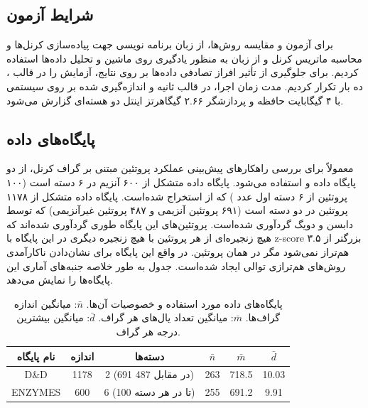 \subsection{شرایط آزمون}
برای آزمون و مقایسه روش‌ها، از زبان برنامه نویسی  جهت پیاده‌سازی کرنل‌ها و محاسبه ماتریس کرنل و از زبان  به منظور یادگیری روی ماشین  و تحلیل داده‌ها استفاده کردیم. برای جلوگیری از تأثیر افراز تصادفی داده‌ها بر روی نتایج، آزمایش را در قالب ، ده بار تکرار کردیم. مدت زمان اجرا، در قالب ثانیه و اندازه‌گیری شده بر روی سیستمی با ۴ گیگابایت حافظه و پردازشگر ۲.۶۶ گیگاهرتز اینتل دو هسته‌ای گزارش می‌شود.

\subsection{پایگاه‌های داده}
معمولاً برای بررسی راهکارهای پیش‌بینی عملکرد پروتئین مبتنی بر گراف کرنل، از دو پایگاه داده  و  استفاده می‌شود.  پایگاه داده متشکل از ۶۰۰ آنزیم در ۶ دسته است (۱۰۰ پروتئین از ۶ دسته اول عدد ) که از  استخراج شده‌است.  پایگاه داده متشکل از ۱۱۷۸ پروتئین در دو دسته است (۶۹۱ پروتئین آنزیمی و ۴۸۷ پروتئین غیرآنزیمی) که توسط دابسن و دویگ گردآوری شده‌است. پروتئین‌های این پایگاه طوری گردآوری شده‌اند که هیچ زنجیره‌ای از هر پروتئین با هیچ زنجیره دیگری در این پایگاه با z-score بزرگتر از ۳.۵ هم‌تراز نمی‌شود مگر در همان پروتئین. در واقع این پایگاه برای نشان‌دادن ناکارآمدی روش‌های هم‌ترازی توالی ایجاد شده‌است. جدول  به طور خلاصه جنبه‌های آماری این پایگاه‌ها را نمایش می‌دهد.

\begin{table}[ht]
\centering
\begin{tabular}{| c | c | c | c | c | c |}
    \hline
    نام پایگاه & اندازه & دسته‌ها & $\bar{n}$ & $\bar{m}$ & $\bar{d}$\\[5pt] \hline
    D\&D & 1178 & 2 (691 در مقابل 487) & 263 & 718.5 & 10.03 \\ \hline
    ENZYMES & 600 & 6 (100 تا در هر دسته) & 255 & 691.2 & 9.91 \\ \hline
\end{tabular}
\caption[پایگاه‌های داده مورد استفاده و خصوصیات آن‌ها]{
    پایگاه‌های داده مورد استفاده و خصوصیات آن‌ها.
 $\bar{n}$: میانگین اندازه گراف‌ها. $\bar{m}$: میانگین تعداد یال‌های هر گراف.  $\bar{d}$: میانگین بیشترین درجه هر گراف.
}
\label{tab:dataset-statistics}
\end{table}

